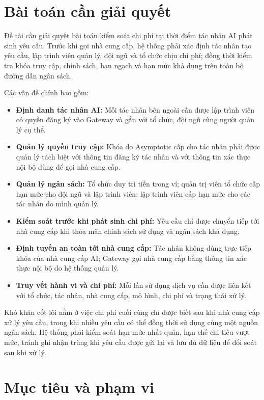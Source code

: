\section{Bài toán cần giải quyết}

Đề tài cần giải quyết bài toán kiểm soát chi phí tại thời điểm tác nhân AI phát sinh yêu cầu. Trước khi gọi nhà cung cấp, hệ thống phải xác định tác nhân tạo yêu cầu, lập trình viên quản lý, đội ngũ và tổ chức chịu chi phí; đồng thời kiểm tra khóa truy cập, chính sách, hạn ngạch và hạn mức khả dụng trên toàn bộ đường dẫn ngân sách.

Các vấn đề chính bao gồm:

\begin{itemize}
    \item \textbf{Định danh tác nhân AI:} Mỗi tác nhân bên ngoài cần được lập trình viên có quyền đăng ký vào Gateway và gắn với tổ chức, đội ngũ cùng người quản lý cụ thể.
    \item \textbf{Quản lý quyền truy cập:} Khóa do Asymptotic cấp cho tác nhân phải được quản lý tách biệt với thông tin đăng ký tác nhân và với thông tin xác thực nội bộ dùng để gọi nhà cung cấp.
    \item \textbf{Quản lý ngân sách:} Tổ chức duy trì tiền trong ví; quản trị viên tổ chức cấp hạn mức cho đội ngũ và lập trình viên; lập trình viên cấp hạn mức cho các tác nhân do mình quản lý.
    \item \textbf{Kiểm soát trước khi phát sinh chi phí:} Yêu cầu chỉ được chuyển tiếp tới nhà cung cấp khi thỏa mãn chính sách sử dụng và ngân sách khả dụng.
    \item \textbf{Định tuyến an toàn tới nhà cung cấp:} Tác nhân không dùng trực tiếp khóa của nhà cung cấp AI; Gateway gọi nhà cung cấp bằng thông tin xác thực nội bộ do hệ thống quản lý.
    \item \textbf{Truy vết hành vi và chi phí:} Mỗi lần sử dụng dịch vụ cần được liên kết với tổ chức, tác nhân, nhà cung cấp, mô hình, chi phí và trạng thái xử lý.
\end{itemize}

Khó khăn cốt lõi nằm ở việc chi phí cuối cùng chỉ được biết sau khi nhà cung cấp xử lý yêu cầu, trong khi nhiều yêu cầu có thể đồng thời sử dụng cùng một nguồn ngân sách. Hệ thống phải kiểm soát hạn mức nhất quán, hạn chế chi tiêu vượt mức, tránh ghi nhận trùng khi yêu cầu được gửi lại và lưu đủ dữ liệu để đối soát sau khi xử lý.

\section{Mục tiêu và phạm vi}

